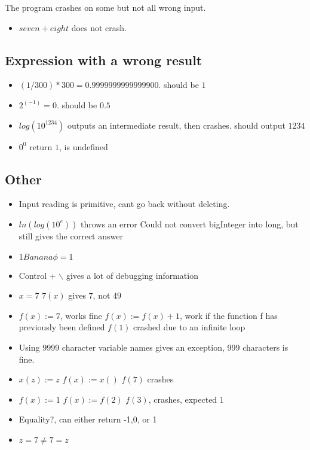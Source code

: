 \documentclass[11pt,a4paper]{article}
\begin{document}
The program crashes on some but not all wrong input.
\begin{itemize}
\item \(seven + eight\) does not crash.
\end{itemize}
\subsection{Expression with a wrong result}
\label{sec:orgheadline35}
\begin{itemize}
\item \((1 / 300) * 300 = 0.9999999999999900\). should be \(1\)
\item \(2^(-1) = 0\). should be \(0.5\)
\item \(log( 10 ^ 1234)\) outputs an intermediate result, then crashes. should output \(1234\)
\item \(0^0\) return \(1\), is undefined
\end{itemize}

\subsection{Other}
\label{sec:orgheadline36}
\begin{itemize}
\item Input reading is primitive, cant go back without deleting.
\item \(ln(log( 10^e ))\) throws an error Could not convert bigInteger into long, but still gives the correct answer
\item \(1 Banana \phi = 1\)
\item Control + $\backslash$ gives a lot of debugging information
\item \(x=7\)
      \(7(x)\) gives \(7\), not \(49\)
\item \(f(x):=7\), works fine
\(f(x):=f(x)+1\), work if the function f has previously been defined
\(f(1)\) crashed due to an infinite loop
\item Using 9999 character variable names gives an exception, 999 characters is fine.
\item \(x(z):=z\)
      \(f(x):=x()\)
      \(f(7)\)
      crashes
\item \(f(x):=1\)
      \(f(x):=f(2)\)
      \(f(3)\), crashes, expected \(1\)
\item Equality?, can either return -1,0, or 1
\item \(z=7 \ne 7=z\)
\end{itemize}
\end{document}
